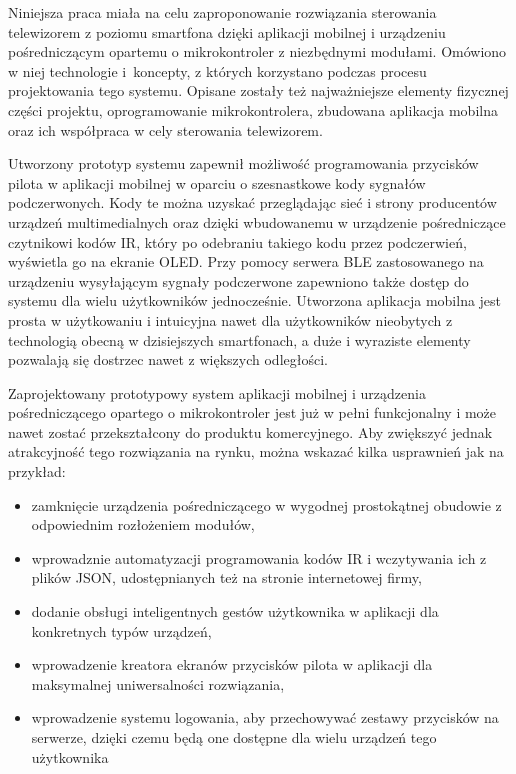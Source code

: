 \documentclass[12pt,twoside]{article}
\begin{document}
Niniejsza praca miała na celu zaproponowanie rozwiązania sterowania telewizorem z poziomu smartfona dzięki aplikacji mobilnej i urządzeniu pośredniczącym opartemu o mikrokontroler z niezbędnymi modułami. Omówiono w niej technologie i~koncepty, z których korzystano podczas procesu projektowania tego systemu. Opisane zostały też najważniejsze elementy fizycznej części projektu, oprogramowanie mikrokontrolera, zbudowana aplikacja mobilna oraz ich współpraca w cely sterowania telewizorem.

Utworzony prototyp systemu zapewnił możliwość programowania przycisków pilota w aplikacji mobilnej w oparciu o szesnastkowe kody sygnałów podczerwonych. Kody te można uzyskać przeglądając sieć i strony producentów urządzeń multimedialnych oraz dzięki wbudowanemu w urządzenie pośredniczące czytnikowi kodów IR, który po odebraniu takiego kodu przez podczerwień, wyświetla go na ekranie OLED. Przy pomocy serwera BLE zastosowanego na urządzeniu wysyłającym sygnały podczerwone zapewniono także dostęp do systemu dla wielu użytkowników jednocześnie. Utworzona aplikacja mobilna jest prosta w użytkowaniu i intuicyjna nawet dla użytkowników nieobytych z technologią obecną w dzisiejszych smartfonach, a duże i wyraziste elementy pozwalają się dostrzec nawet z większych odległości.

Zaprojektowany prototypowy system aplikacji mobilnej i urządzenia pośredniczącego opartego o mikrokontroler jest już w pełni funkcjonalny i może nawet zostać przekształcony do produktu komercyjnego. Aby zwiększyć jednak atrakcyjność tego rozwiązania na rynku, można wskazać kilka usprawnień jak na przykład:
\begin{itemize}[label=-,labelsep=0.4cm,leftmargin=0.65cm]
   \item zamknięcie urządzenia pośredniczącego w wygodnej prostokątnej obudowie z odpowiednim rozłożeniem modułów,
   \item wprowadznie automatyzacji programowania kodów IR i wczytywania ich z plików JSON, udostępnianych też na stronie internetowej firmy,
   \item dodanie obsługi inteligentnych gestów użytkownika w aplikacji dla konkretnych typów urządzeń,
   \item wprowadzenie kreatora ekranów przycisków pilota w aplikacji dla maksymalnej uniwersalności rozwiązania,
   \item wprowadzenie systemu logowania, aby przechowywać zestawy przycisków na serwerze, dzięki czemu będą one dostępne dla wielu urządzeń tego użytkownika
   
\end{itemize}
\end{document}
